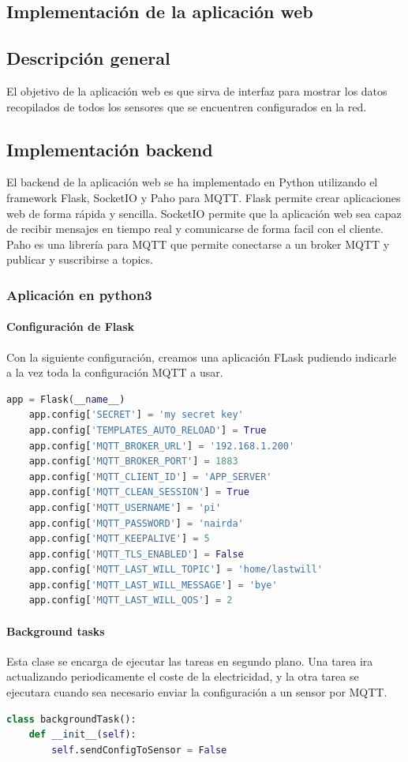 \begin{titlepage}
\chapter{Implementación de la aplicación web}
\section{Descripción general}
El objetivo de la aplicación web es que sirva de interfaz para mostrar los datos recopilados de todos los sensores que se encuentren configurados en la red. 
\section{Implementación backend}
El backend de la aplicación web se ha implementado en Python utilizando el framework Flask, SocketIO y Paho para MQTT. Flask permite crear aplicaciones web de forma rápida y sencilla. SocketIO permite que la aplicación web sea capaz de recibir mensajes en tiempo real y comunicarse de forma facil con el cliente. Paho es una librería para MQTT que permite conectarse a un broker MQTT y publicar y suscribirse a topics.
\subsection{Aplicación en python3}
\subsubsection{Configuración de Flask}
Con la siguiente configuración, creamos una aplicación FLask pudiendo indicarle a la vez toda la configuración MQTT a usar.
\begin{lstlisting}[language=python]
	app = Flask(__name__)
	app.config['SECRET'] = 'my secret key'
	app.config['TEMPLATES_AUTO_RELOAD'] = True
	app.config['MQTT_BROKER_URL'] = '192.168.1.200'
	app.config['MQTT_BROKER_PORT'] = 1883
	app.config['MQTT_CLIENT_ID'] = 'APP_SERVER'
	app.config['MQTT_CLEAN_SESSION'] = True
	app.config['MQTT_USERNAME'] = 'pi'
	app.config['MQTT_PASSWORD'] = 'nairda'
	app.config['MQTT_KEEPALIVE'] = 5
	app.config['MQTT_TLS_ENABLED'] = False
	app.config['MQTT_LAST_WILL_TOPIC'] = 'home/lastwill'
	app.config['MQTT_LAST_WILL_MESSAGE'] = 'bye'
	app.config['MQTT_LAST_WILL_QOS'] = 2
\end{lstlisting}

\subsubsection{Background tasks}
Esta clase se encarga de ejecutar las tareas en segundo plano. Una tarea ira actualizando periodicamente el coste de la electricidad, y la otra tarea se ejecutara cuando sea necesario enviar la configuración a un sensor por MQTT.\\
\begin{lstlisting}[language=python]
class backgroundTask():
    def __init__(self):
        self.sendConfigToSensor = False


\end{lstlisting}
\end{titlepage}
